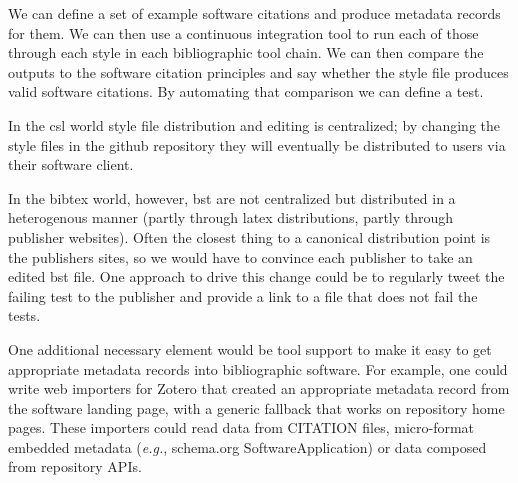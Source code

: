 \documentclass[a4paper,UKenglish]{dagman}
\newcommand{\eg}{\emph{e.g.},\xspace}
\begin{document}
We can define a set of example software citations and produce metadata records for them. We can then use a continuous integration tool to run each of those through each style in each bibliographic tool chain. We can then compare the outputs to the software citation principles and say whether the style file produces valid software citations. By automating that comparison we can define a test.

In the csl world style file distribution and editing is centralized; by changing the style files in the github repository they will eventually be distributed to users via their software client.

In the bibtex world, however, bst are not centralized but distributed in a heterogenous manner (partly through latex distributions, partly through publisher websites). Often the closest thing to a canonical distribution point is the publishers sites, so we would have to convince each publisher to take an edited bst file.  One approach to drive this change could be to regularly tweet the failing test to the publisher and provide a link to a file that does not fail the tests.

One additional necessary element would be tool support to make it easy to get appropriate metadata records into bibliographic software. For example, one could write web importers for Zotero that created an appropriate metadata record from the software landing page, with a generic fallback that works on repository home pages. These importers could read data from CITATION files, micro-format embedded metadata (\eg schema.org SoftwareApplication) or data composed from repository APIs.
\end{document}
